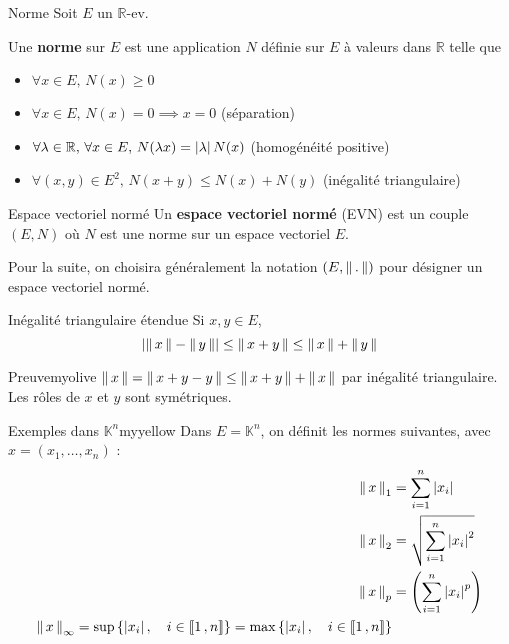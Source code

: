     \begin{defi}{Norme}{}
            Soit $E$ un $\mathbb{R}$-ev.
            
            Une \textbf{norme} sur $E$ est une application $N$ définie sur $E$ à valeurs dans $\mathbb{R}$ telle que 
            \begin{itemize}
                \item $\forall x \in E, \, N(x) \geq 0$
                \item $\forall x \in E, \, N(x) = 0 \implies x = 0$ \quad (séparation)
                \item $\forall \lambda \in \mathbb{R}, \, \forall x \in E, \, N(\lambda x) = \abs{\lambda}N(x)$ \quad (homogénéité positive)
                \item $\forall (x,y) \in E^2, \, N(x+y) \leq N(x) + N(y)$ \quad (inégalité triangulaire)
            \end{itemize}
    \end{defi}

    \begin{defi}{Espace vectoriel normé}{}
        Un \textbf{espace vectoriel normé} (EVN) est un couple $(E, N)$ où $N$ est une norme sur un espace vectoriel $E$.
    \end{defi}

    Pour la suite, on choisira généralement la notation $(E, \norm{.})$ pour désigner un espace vectoriel normé.

    \begin{prop}{Inégalité triangulaire étendue}{}
        Si $x,y \in E$, 
        \[ \abs{\norm{x} - \norm{y}} \leq \norm{x + y} \leq \norm{x} + \norm{y} \]   
    \end{prop}
    
    \begin{demo}{Preuve}{myolive}
        $\norm{x} = \norm{x + y - y} \leq \norm{x + y} + \norm{x}$ par inégalité triangulaire. Les rôles de $x$ et $y$ sont symétriques.
    \end{demo}

    \begin{omed}{Exemples dans $\mathbb{K}^n$}{myyellow}
        Dans $E = \mathbb{K}^n$, on définit les normes suivantes, avec $x = (x_1,\ldots,x_n)$ :
        \begin{align*}
            \nnorm{1}{x} &= \sum_{i=1}^{n} \abs{x_i} \\
            \nnorm{2}{x} &= \sqrt{\sum_{i=1}^{n} \abs{x_i}^2} \\
            \nnorm{p}{x} &= \left(\sum_{i=1}^{n} \abs{x_i}^p\right) \\
            \nnorm{\infty}{x} = \sup\left\{\abs{x_i}, \quad i \in \intervalleEntier{1}{n}\right\} = \max\left\{\abs{x_i}, \quad i \in \intervalleEntier{1}{n}\right\}
        \end{align*}
    \end{omed}

